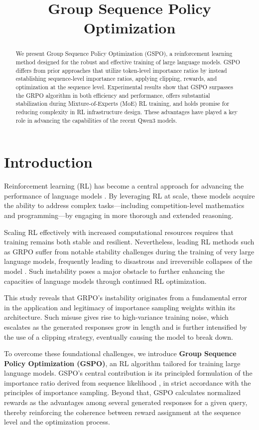 \title{Group Sequence Policy Optimization}

\begin{abstract}
We present Group Sequence Policy Optimization (GSPO), a reinforcement learning method designed for the robust and effective training of large language models. GSPO differs from prior approaches that utilize token-level importance ratios by instead establishing sequence-level importance ratios, applying clipping, rewards, and optimization at the sequence level. Experimental results show that GSPO surpasses the GRPO algorithm in both efficiency and performance, offers substantial stabilization during Mixture-of-Experts (MoE) RL training, and holds promise for reducing complexity in RL infrastructure design. These advantages have played a key role in advancing the capabilities of the recent Qwen3 models.
\end{abstract}

\section{Introduction}
\label{sec:intro}

Reinforcement learning (RL) has become a central approach for advancing the performance of language models \citep{o1,dpsk-r1,qwq32b,qwen3}. By leveraging RL at scale, these models acquire the ability to address complex tasks—including competition-level mathematics and programming—by engaging in more thorough and extended reasoning.

Scaling RL effectively with increased computational resources requires that training remains both stable and resilient. Nevertheless, leading RL methods such as GRPO \citep{grpo} suffer from notable stability challenges during the training of very large language models, frequently leading to disastrous and irreversible collapses of the model \citep{qwen3, minimax-m1}. Such instability poses a major obstacle to further enhancing the capacities of language models through continued RL optimization.

This study reveals that GRPO's instability originates from a fundamental error in the application and legitimacy of importance sampling weights within its architecture. Such misuse gives rise to high-variance training noise, which escalates as the generated responses grow in length and is further intensified by the use of a clipping strategy, eventually causing the model to break down.

To overcome these foundational challenges, we introduce \textbf{Group Sequence Policy Optimization (GSPO)}, an RL algorithm tailored for training large language models. GSPO's central contribution is its principled formulation of the importance ratio derived from sequence likelihood \citep{click}, in strict accordance with the principles of importance sampling. Beyond that, GSPO calculates normalized rewards as the advantages among several generated responses for a given query, thereby reinforcing the coherence between reward assignment at the sequence level and the optimization process.

